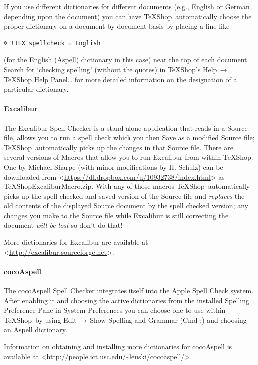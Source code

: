 \documentclass[letterpaper,11pt]{article}
\newcommand{\TS}{\textsf{\TeX Shop}}
\newcommand{\cmd}[1]{\textsf{#1}}
\newcommand{\mnu}[1]{\textsf{#1}}
\newcommand{\To}{\,\(\to\)\,}
\begin{document}
If you use different dictionaries for different documents (e.g., English or German depending upon the document) you can have \TS\ automatically choose the proper dictionary on a document by document basis by placing a line like
\begin{verbatim}
% !TEX spellcheck = English
\end{verbatim}
(for the \cmd{English (Aspell)} dictionary in this case) near the top of each document. Search for `\cmd{checking spelling}' (without the quotes) in \TS's \mnu{Help}\To\mnu{TeXShop Help Panel…} for more detailed information on the designation of a particular dictionary.

\paragraph{\cmd{Excalibur}}

The \cmd{Excalibur} Spell Checker is a stand-alone application that reads in a Source file, allows you to run a spell check which you then Save as a modified Source file; \TS\ automatically picks up the changes in that Source file. There are several versions of Macros that allow you to run \cmd{Excalibur} from within \TS. One by Michael Sharpe (with minor modifications by H. Schulz) can be downloaded from <\url{https://dl.dropbox.com/u/10932738/index.html}> as \cmd{TeXShopExcaliburMacro.zip}. With any of those macros \TS\ automatically picks up the spell checked and saved version of the Source file and \emph{replaces} the old contents of the displayed Source document by the spell checked version; any changes you make to the Source file while \cmd{Excalibur} is still correcting the document \emph{will be lost} so don't do that!

More dictionaries for \cmd{Excalibur} are available at <\url{http://excalibur.sourceforge.net}>.

\paragraph{\cmd{cocoAspell}}

The \cmd{cocoAspell} Spell Checker integrates itself into the Apple Spell Check system. After enabling it and choosing the active dictionaries from the installed \cmd{Spelling} Preference Pane in \cmd{System Preferences} you can choose one to use within \TS\ by using \mnu{Edit}\To\mnu{Show Spelling and Grammar} (\cmd{Cmd-:}) and choosing an \cmd{Aspell} dictionary.

Information on obtaining and installing more dictionaries for \cmd{cocoAspell} is available at <\url{http://people.ict.usc.edu/~leuski/cocoaspell/}>.
\end{document}
